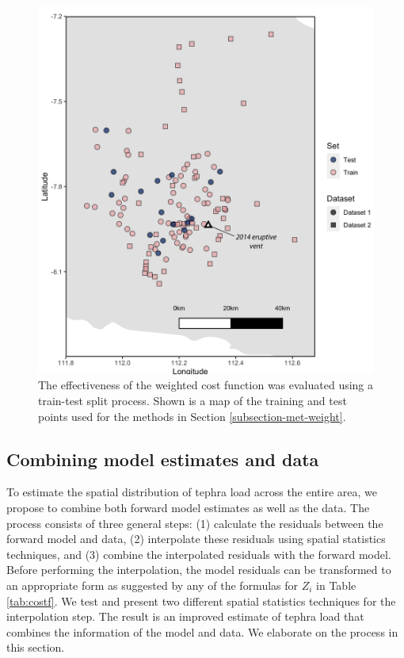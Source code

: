     \begin{figure}[htbp]
    \centering
    \includegraphics[width=.9\linewidth]{Figures/fig4_train-test.png}
    \caption{The effectiveness of the weighted cost function was evaluated using a train-test split process. Shown is a map of the training and test points used for the methods in Section \ref{subsection-met-weight}.}
    \label{fig:train-test}
    \end{figure}

\subsection{Combining model estimates and data} 
\label{subsection-kriging}

To estimate the spatial distribution of tephra load across the entire area, we propose to combine both forward model estimates as well as the data. The process consists of three general steps: (1) calculate the residuals between the forward model and data, (2) interpolate these residuals using spatial statistics techniques, and (3) combine the interpolated residuals with the forward model. Before performing the interpolation, the model residuals can be transformed to an appropriate form as suggested by any of the formulas for $Z_{i}$ in Table \ref{tab:costf}. We test and present two different spatial statistics techniques for the interpolation step. The result is an improved estimate of tephra load that combines the information of the model and data. We elaborate on the process in this section. 

